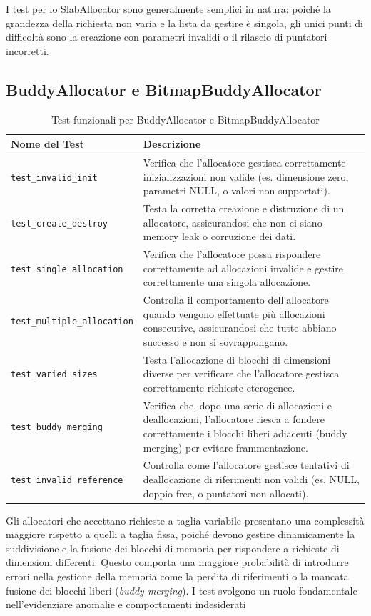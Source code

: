 I test per lo SlabAllocator sono generalmente semplici in natura: poiché la grandezza della richiesta non varia e la lista da gestire è singola, gli unici punti di difficoltà sono la creazione con parametri invalidi o il rilascio di puntatori incorretti.


\subsection{BuddyAllocator e BitmapBuddyAllocator}
\begin{table}[H]
\centering
\begin{tabularx}{\textwidth}{|l|X|}
\hline
\textbf{Nome del Test} & \textbf{Descrizione} \\
\hline
\texttt{test\_invalid\_init} & Verifica che l'allocatore gestisca correttamente inizializzazioni non valide (es. dimensione zero, parametri NULL, o valori non supportati). \\
\hline
\texttt{test\_create\_destroy} & Testa la corretta creazione e distruzione di un allocatore, assicurandosi che non ci siano memory leak o corruzione dei dati. \\
\hline
\texttt{test\_single\_allocation} & Verifica che l'allocatore possa rispondere correttamente ad allocazioni invalide e gestire correttamente una singola allocazione. \\
\hline
\texttt{test\_multiple\_allocation} & Controlla il comportamento dell'allocatore quando vengono effettuate più allocazioni consecutive, assicurandosi che tutte abbiano successo e non si sovrappongano. \\
\hline
\texttt{test\_varied\_sizes} & Testa l'allocazione di blocchi di dimensioni diverse per verificare che l'allocatore gestisca correttamente richieste eterogenee. \\
\hline
\texttt{test\_buddy\_merging} & Verifica che, dopo una serie di allocazioni e deallocazioni, l'allocatore riesca a fondere correttamente i blocchi liberi adiacenti (buddy merging) per evitare frammentazione. \\
\hline
\texttt{test\_invalid\_reference} & Controlla come l'allocatore gestisce tentativi di deallocazione di riferimenti non validi (es. NULL, doppio free, o puntatori non allocati). \\
\hline
\end{tabularx}
\caption{Test funzionali per BuddyAllocator e BitmapBuddyAllocator}
\end{table}

Gli allocatori che accettano richieste a taglia variabile presentano una complessità maggiore rispetto a quelli a taglia fissa, poiché devono gestire dinamicamente la suddivisione e la fusione dei blocchi di memoria per rispondere a richieste di dimensioni differenti. Questo comporta una maggiore probabilità di introdurre errori nella gestione della memoria come la perdita di riferimenti o la mancata fusione dei blocchi liberi (\emph{buddy merging}). I test svolgono un ruolo fondamentale nell'evidenziare anomalie e comportamenti indesiderati

